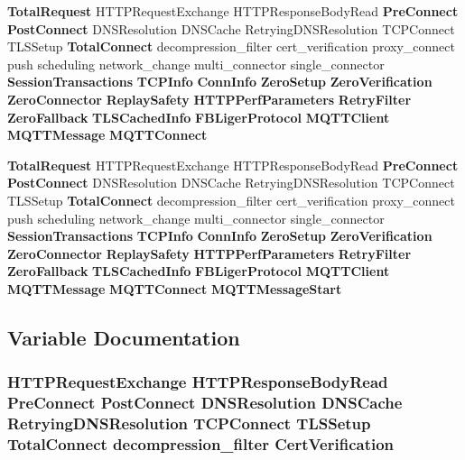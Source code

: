 \begin{DoxyCompactItemize}
\item 
{\bf Total\+Request} H\+T\+T\+P\+Request\+Exchange H\+T\+T\+P\+Response\+Body\+Read {\bf Pre\+Connect} {\bf Post\+Connect} D\+N\+S\+Resolution D\+N\+S\+Cache Retrying\+D\+N\+S\+Resolution T\+C\+P\+Connect T\+L\+S\+Setup {\bf Total\+Connect} decompression\+\_\+filter cert\+\_\+verification proxy\+\_\+connect push scheduling network\+\_\+change multi\+\_\+connector single\+\_\+connector {\bf Session\+Transactions} {\bf T\+C\+P\+Info} {\bf Conn\+Info} {\bf Zero\+Setup} {\bf Zero\+Verification} {\bf Zero\+Connector} {\bf Replay\+Safety} {\bf H\+T\+T\+P\+Perf\+Parameters} {\bf Retry\+Filter} {\bf Zero\+Fallback} {\bf T\+L\+S\+Cached\+Info} {\bf F\+B\+Liger\+Protocol} {\bf M\+Q\+T\+T\+Client} {\bf M\+Q\+T\+T\+Message} {\bf M\+Q\+T\+T\+Connect}
\item 
{\bf Total\+Request} H\+T\+T\+P\+Request\+Exchange H\+T\+T\+P\+Response\+Body\+Read {\bf Pre\+Connect} {\bf Post\+Connect} D\+N\+S\+Resolution D\+N\+S\+Cache Retrying\+D\+N\+S\+Resolution T\+C\+P\+Connect T\+L\+S\+Setup {\bf Total\+Connect} decompression\+\_\+filter cert\+\_\+verification proxy\+\_\+connect push scheduling network\+\_\+change multi\+\_\+connector single\+\_\+connector {\bf Session\+Transactions} {\bf T\+C\+P\+Info} {\bf Conn\+Info} {\bf Zero\+Setup} {\bf Zero\+Verification} {\bf Zero\+Connector} {\bf Replay\+Safety} {\bf H\+T\+T\+P\+Perf\+Parameters} {\bf Retry\+Filter} {\bf Zero\+Fallback} {\bf T\+L\+S\+Cached\+Info} {\bf F\+B\+Liger\+Protocol} {\bf M\+Q\+T\+T\+Client} {\bf M\+Q\+T\+T\+Message} {\bf M\+Q\+T\+T\+Connect} {\bf M\+Q\+T\+T\+Message\+Start}
\end{DoxyCompactItemize}


\subsection{Variable Documentation}
\subsubsection[{Cert\+Verification}]{ H\+T\+T\+P\+Request\+Exchange H\+T\+T\+P\+Response\+Body\+Read {\bf Pre\+Connect} {\bf Post\+Connect} D\+N\+S\+Resolution D\+N\+S\+Cache Retrying\+D\+N\+S\+Resolution T\+C\+P\+Connect T\+L\+S\+Setup {\bf Total\+Connect} decompression\+\_\+filter Cert\+Verification}\label{TraceEventType_8txt_a686d30d8e3cfc33fef4c4b97ecadfec9}


